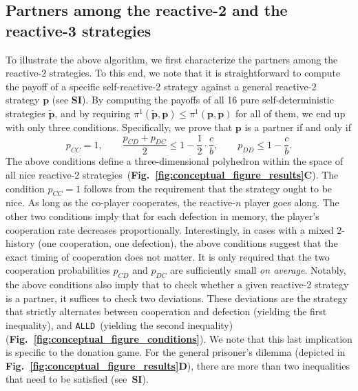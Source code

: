 \documentclass[9pt,twocolumn,twoside]{pnas-new}
\newcommand{\figref}[1]{{\textbf{Fig.~\ref{#1}}}}
\def\alld{\texttt{ALLD}}
\def\SI{\textbf{SI}}
\begin{document}

\noindent
\subsection*{Partners among the reactive-2 and the reactive-3 strategies}
To illustrate the above algorithm, we first characterize the partners among the reactive-$2$ strategies. 
To this end, we note that it is straightforward to compute the payoff of a specific self-reactive-2 strategy against a general reactive-2 strategy $\mathbf{p}$ (see \SI{}). 
By computing the payoffs of all 16 pure self-deterministic strategies $\mathbf{\tilde p}$, and by requiring $\pi^1(\mathbf{\tilde p},\mathbf{p}) \!\le\! \pi^1(\mathbf{p},\mathbf{p})$ for all of them, we end up with only three conditions. Specifically, we prove that $\mathbf{p}$ is a partner if and only if
\begin{equation}\label{eq:two_bit_conditions}
p_{CC} = 1, \qquad  \frac{p_{CD} + p_{DC}}{2} \le 1 - \frac{1}{2} \!\cdot\! \frac{c}{b}, \qquad  p_{DD} \leq 1\!-\! \frac{c}{b}.
\end{equation}
The above conditions define a three-dimensional polyhedron within the space of all nice reactive-2 strategies~(\figref{fig:conceptual_figure_results}\textbf{C}).
The condition $p_{CC}\!=\!1$ follows from the requirement that the strategy ought to be nice. 
As long as the co-player cooperates, the reactive-$n$ player goes along. 
The other two conditions imply that for each defection in memory, the player's cooperation rate decreases proportionally.
Interestingly, in cases with a mixed $2$-history (one cooperation, one defection), the above conditions suggest that the exact timing of cooperation does not matter. 
It is only required that the two cooperation probabilities $p_{CD}$ and $p_{DC}$ are sufficiently small {\it on average}. 
Notably, the above conditions also imply that to check whether a given reactive-2 strategy is a partner, it suffices to check two deviations. 
These deviations are the strategy that strictly alternates between cooperation and defection (yielding the first inequality), and \alld~(yielding the second inequality) (\figref{fig:conceptual_figure_conditions}). 
We note that this last implication is specific to the donation game. 
For the general prisoner's dilemma (depicted in \figref{fig:conceptual_figure_results}\textbf{D}), there are more than two inequalities that need to be satisfied (see~\SI{}).
\end{document}
